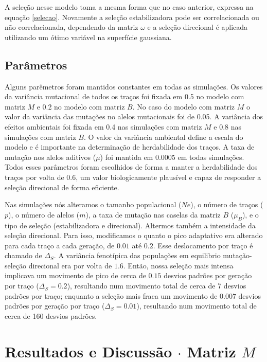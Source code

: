\documentclass[a4paper, 12pt, titlepage, onecolumn]{article}
\numberwithin{equation}{section}
\numberwithin{table}{section}
\begin{document}
A seleção nesse modelo toma a mesma forma que no caso anterior, expressa
na equação \ref{selecao}. Novamente a seleção estabilizadora pode ser
correlacionada ou não correlacionada, dependendo da matriz $\omega$ e a
seleção direcional é aplicada utilizando um ótimo variável na superfície
gaussiana.

\subsection{Parâmetros}

Alguns parêmetros foram mantidos constantes em todas as simulações. Os
valores da variância mutacional de todos os traços foi fixada em 0.5 no
modelo com matriz $M$ e 0.2 no modelo com matriz $B$. No caso do modelo
com matriz $M$ o valor da variância das mutações no alelos mutacionais
foi de 0.05. A variância dos efeitos ambientais foi fixada em 0.4 nas
simulações com matriz $M$ e 0.8 nas simulações com matriz $B$. O valor
da variância ambiental define a escala do modelo e é importante na
determinação de herdabilidade dos traços. A taxa de mutação nos alelos
aditivos ($\mu$) foi mantida em 0.0005 em todas simulações. Todos esses
parâmetros foram escolhidos de forma a manter a herdabilidade dos traços
por volta de 0.6, um valor biologicamente plausível e capaz de responder
a seleção direcional de forma eficiente.

Nas simulações nós alteramos o tamanho populacional ($Ne$), o número de
traços ($p$), o número de alelos ($m$), a taxa de mutação nas caselas da
matriz $B$ ($\mu_B$), e o tipo de seleção (estabilizadora e direcional).
Altermos também a intensidade da seleção direcional. Para isso,
modificamos o quanto o pico adaptativo era alterado para cada traço a
cada geração, de $0.01$ até $0.2$. Esse deslocamento por traço é chamado
de $\Delta_S$. A variância fenotípica das populações
em equilibrio mutação-seleção direcional era por volta de $1.6$. Então,
nossa seleção mais intensa implicava um movimento de pico de cerca de
$0.15$ desvios padrões por geração por traço ($\Delta_S=0.2$), resultando num movimento total de cerca de 7 desvios padrões por traço; enquanto a seleção mais
fraca um movimento de $0.007$ desvios padrões por geração por traço ($\Delta_S=0.01$), resultando num movimento total de cerca de 160 desvios padrões.

\section{Resultados e Discussão $\cdot$ Matriz $M$}
\end{document}
